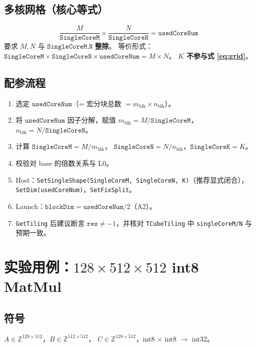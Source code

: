 \documentclass[UTF8,a4paper,11pt]{ctexart}
\begin{document}
\subsection{多核网格（核心等式）}
\begin{equation}
  \frac{M}{\texttt{SingleCoreM}} \times \frac{N}{\texttt{SingleCoreN}}
  = \texttt{usedCoreNum}
  \label{eq:grid}
\end{equation}
要求 $M,N$ 与 $\texttt{SingleCoreM,N}$ \textbf{整除}。
等价形式：
$\texttt{SingleCoreM} \times \texttt{SingleCoreN} \times \texttt{usedCoreNum} = M \times N$。
\textbf{$K$ 不参与式 \eqref{eq:grid}}。

\subsection{配参流程}
\begin{enumerate}
  \item 选定 $\texttt{usedCoreNum}$（= 宏分块总数 $= m_{\mathrm{blk}} \times n_{\mathrm{blk}}$）。
  \item 将 $\texttt{usedCoreNum}$ 因子分解，赋值
        $m_{\mathrm{blk}} = M/\texttt{SingleCoreM}$，
        $n_{\mathrm{blk}} = N/\texttt{SingleCoreN}$。
  \item 计算 $\texttt{SingleCoreM} = M/m_{\mathrm{blk}}$，
        $\texttt{SingleCoreN} = N/n_{\mathrm{blk}}$，$\texttt{SingleCoreK} = K$。
  \item 校验对 base 的倍数关系与 L0。
  \item Host：\texttt{SetSingleShape(SingleCoreM, SingleCoreN, K)}（推荐显式闭合），
        \texttt{SetDim(usedCoreNum)}，\texttt{SetFixSplit}。
  \item Launch：$\texttt{blockDim} = \texttt{usedCoreNum}/2$（A2）。
  \item \texttt{GetTiling} 后建议断言 $\texttt{res} \neq -1$，并核对
        \texttt{TCubeTiling} 中 \texttt{singleCoreM/N} 与预期一致。
\end{enumerate}

\section{实验用例：$128 \times 512 \times 512$ int8 MatMul}

\subsection{符号}
$A \in \mathbb{Z}^{128 \times 512}$，$B \in \mathbb{Z}^{512 \times 512}$，
$C \in \mathbb{Z}^{128 \times 512}$，int8 $\times$ int8 $\rightarrow$ int32。
\end{document}
